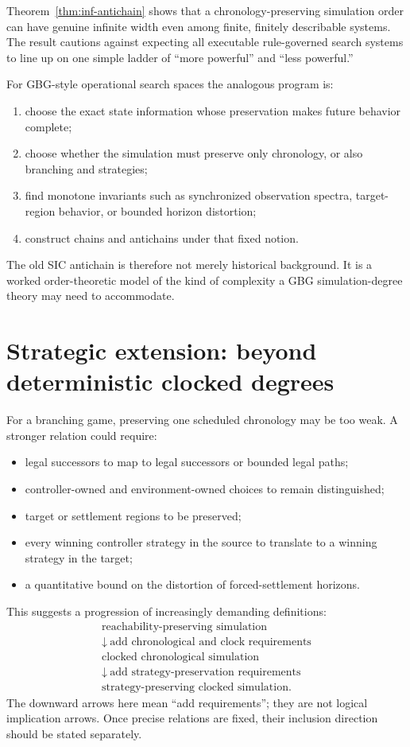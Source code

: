 \documentclass[11pt]{article}
\theoremstyle{remark}
\begin{document}
Theorem~\ref{thm:inf-antichain} shows that a chronology-preserving simulation order can have genuine
infinite width even among finite, finitely describable systems.
The result cautions against expecting all executable rule-governed search systems to line up on one
simple ladder of ``more powerful'' and ``less powerful.''

For GBG-style operational search spaces the analogous program is:
\begin{enumerate}[leftmargin=2em]
\item choose the exact state information whose preservation makes future behavior complete;
\item choose whether the simulation must preserve only chronology, or also branching and strategies;
\item find monotone invariants such as synchronized observation spectra, target-region behavior,
      or bounded horizon distortion;
\item construct chains and antichains under that fixed notion.
\end{enumerate}

The old SIC antichain is therefore not merely historical background.
It is a worked order-theoretic model of the kind of complexity a GBG simulation-degree theory may
need to accommodate.

\section{Strategic extension: beyond deterministic clocked degrees}

For a branching game, preserving one scheduled chronology may be too weak.
A stronger relation could require:
\begin{itemize}[leftmargin=2em]
\item legal successors to map to legal successors or bounded legal paths;
\item controller-owned and environment-owned choices to remain distinguished;
\item target or settlement regions to be preserved;
\item every winning controller strategy in the source to translate to a winning strategy in the target;
\item a quantitative bound on the distortion of forced-settlement horizons.
\end{itemize}

This suggests a progression of increasingly demanding definitions:
\[
\begin{array}{c}
\text{reachability-preserving simulation}\\[0.2em]
\downarrow\ \text{add chronological and clock requirements}\\[0.2em]
\text{clocked chronological simulation}\\[0.2em]
\downarrow\ \text{add strategy-preservation requirements}\\[0.2em]
\text{strategy-preserving clocked simulation}.
\end{array}
\]
The downward arrows here mean ``add requirements''; they are not logical implication arrows. Once precise
relations are fixed, their inclusion direction should be stated separately.
\end{document}
